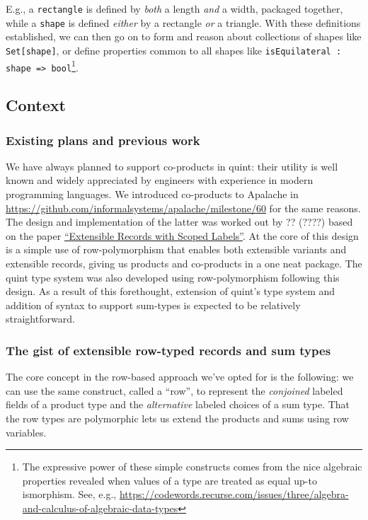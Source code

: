 \documentclass[11pt]{article}
\begin{document}
E.g., a \texttt{rectangle} is defined by \emph{both} a length \emph{and} a width,
packaged together, while a \texttt{shape} is defined \emph{either} by a rectangle
\emph{or} a triangle. With these definitions established, we can then go on
to form and reason about collections of shapes like \texttt{Set[shape]}, or
define properties common to all shapes like
\texttt{isEquilateral : shape => bool}\footnote{The expressive power of these simple constructs comes from the
nice algebraic properties revealed when values of a type are
treated as equal up-to ismorphism. See, e.g.,
\url{https://codewords.recurse.com/issues/three/algebra-and-calculus-of-algebraic-data-types}}.

\subsection{Context}
\label{sec:orgea625f3}
\subsubsection{Existing plans and previous work}
\label{sec:orgc77cf04}
We have always planned to support co-products in quint: their utility is well
known and widely appreciated by engineers with experience in modern programming
languages. We introduced co-products to Apalache in
\url{https://github.com/informalsystems/apalache/milestone/60} for the same reasons.
The design and implementation of the latter was worked out by ?? (????)
based on the paper \href{https://www.microsoft.com/en-us/research/publication/extensible-records-with-scoped-labels/}{``Extensible Records with Scoped Labels''}. At the core of this
design is a simple use of row-polymorphism that enables both extensible variants
and extensible records, giving us products and co-products in a one neat
package. The quint type system was also developed using row-polymorphism
following this design. As a result of this forethought, extension of quint's
type system and addition of syntax to support sum-types is expected to be
relatively straightforward.

\subsubsection{The gist of extensible row-typed records and sum types}
\label{sec:org6428ac3}
The core concept in the row-based approach we've opted for is the
following: we can use the same construct, called a ``row'', to represent
the \emph{conjoined} labeled fields of a product type and the \emph{alternative}
labeled choices of a sum type. That the row types are polymorphic lets
us extend the products and sums using row variables.
\end{document}
